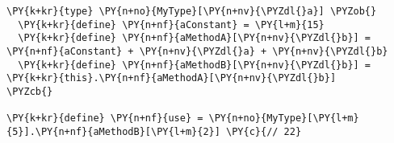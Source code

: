 \begin{Verbatim}[commandchars=\\\{\}]
\PY{k+kr}{type} \PY{n+no}{MyType}[\PY{n+nv}{\PYZdl{}a}] \PYZob{}
  \PY{k+kr}{define} \PY{n+nf}{aConstant} = \PY{l+m}{15}
  \PY{k+kr}{define} \PY{n+nf}{aMethodA}[\PY{n+nv}{\PYZdl{}b}] = \PY{n+nf}{aConstant} + \PY{n+nv}{\PYZdl{}a} + \PY{n+nv}{\PYZdl{}b}
  \PY{k+kr}{define} \PY{n+nf}{aMethodB}[\PY{n+nv}{\PYZdl{}b}] = \PY{k+kr}{this}.\PY{n+nf}{aMethodA}[\PY{n+nv}{\PYZdl{}b}]
\PYZcb{}

\PY{k+kr}{define} \PY{n+nf}{use} = \PY{n+no}{MyType}[\PY{l+m}{5}].\PY{n+nf}{aMethodB}[\PY{l+m}{2}] \PY{c}{// 22}
\end{Verbatim}
